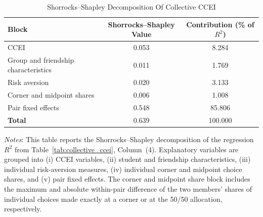 \documentclass[11 pt]{article}
\begin{document}
\begin{table}[H]
\centering
\caption{Shorrocks--Shapley Decomposition Of Collective CCEI}
\label{tab:shapley}
\begin{tabular}{lcc}
\toprule \hline
Block
    & Shorrocks--Shapley Value
    & Contribution (\% of $R^2$) \\
\midrule
CCEI                                  & 0.053 & 8.284 \\
Group and friendship characteristics & 0.011 & 1.769 \\
Risk aversion                         & 0.020 & 3.133 \\
Corner and midpoint shares            & 0.006 & 1.008 \\
Pair fixed effects                    & 0.548 & 85.806 \\
\midrule
\textbf{Total}                        & 0.639 & 100.000 \\
\hline \bottomrule
\end{tabular}
\begin{minipage}{\textwidth}
{\footnotesize \emph{Notes}: This table reports the Shorrocks--Shapley decomposition of the regression $R^2$ from Table~\ref{tab:collective_ccei}, Column~(4). Explanatory variables are grouped into (i) CCEI variables, (ii) student and friendship characteristics, (iii) individual risk-aversion measures, (iv) individual corner and midpoint choice shares, and (v) pair fixed effects. The corner and midpoint share block includes the maximum and absolute within-pair difference of the two members' shares of individual choices made exactly at a corner or at the 50/50 allocation, respectively.}
\end{minipage}
\end{table}

\end{document}
